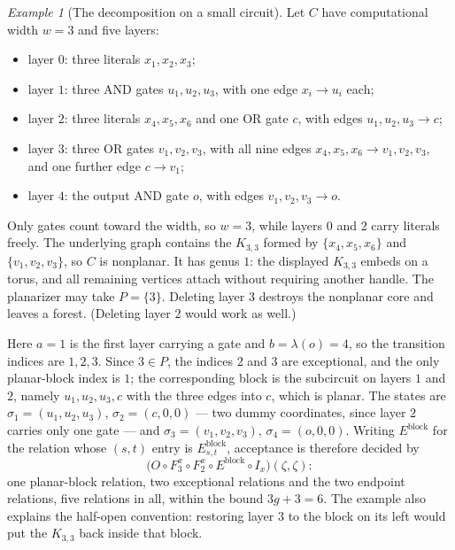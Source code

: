 \documentclass[11pt]{article}
\theoremstyle{definition}
\theoremstyle{remark}
\newtheorem{example}[theorem]{Example}
\newcommand{\layer}{\lambda}
\newcommand{\comp}{\circ}
\begin{document}
\begin{example}[The decomposition on a small circuit]\label{ex:pipeline}
Let $C$ have computational width $w=3$ and five layers:
\begin{itemize}
\item layer $0$: three literals $x_1,x_2,x_3$;
\item layer $1$: three $\mathrm{AND}$ gates $u_1,u_2,u_3$, with one edge $x_i\to u_i$ each;
\item layer $2$: three literals $x_4,x_5,x_6$ and one $\mathrm{OR}$ gate $c$, with edges
      $u_1,u_2,u_3\to c$;
\item layer $3$: three $\mathrm{OR}$ gates $v_1,v_2,v_3$, with all nine edges
      $x_4,x_5,x_6\to v_1,v_2,v_3$, and one further edge $c\to v_1$;
\item layer $4$: the output $\mathrm{AND}$ gate $o$, with edges $v_1,v_2,v_3\to o$.
\end{itemize}
Only gates count toward the width, so $w=3$, while layers $0$ and $2$ carry literals
freely. The underlying graph contains the $K_{3,3}$ formed by $\{x_4,x_5,x_6\}$ and
$\{v_1,v_2,v_3\}$, so $C$ is nonplanar.  It has genus $1$: the displayed $K_{3,3}$
embeds on a torus, and all remaining vertices attach without requiring another
handle.  The planarizer may take $P=\{3\}$.  Deleting layer $3$ destroys the
nonplanar core and leaves a forest.  (Deleting layer $2$ would work as well.)

Here $a=1$ is the first layer carrying a gate and $b=\layer(o)=4$, so the transition
indices are $1,2,3$. Since $3\in P$, the indices $2$ and $3$ are exceptional, and the
only planar-block index is $1$; the corresponding block is the subcircuit on layers $1$
and $2$, namely $u_1,u_2,u_3,c$ with the three edges into $c$, which is planar. The
states are $\sigma_1=(u_1,u_2,u_3)$, $\sigma_2=(c,0,0)$ --- two dummy coordinates, since
layer $2$ carries only one gate --- and $\sigma_3=(v_1,v_2,v_3)$,
$\sigma_4=(o,0,0)$. Writing $E^{\mathrm{block}}$ for the relation whose $(s,t)$ entry is
$E^{\mathrm{block}}_{s,t}$, acceptance is therefore decided by
\[
\bigl(O\comp F^x_{3}\comp F^x_{2}\comp E^{\mathrm{block}}\comp I_x\bigr)(\zeta,\zeta):
\]
one planar-block relation, two exceptional relations and the two endpoint relations,
five relations in all, within the bound $3g+3=6$.  The example also explains the
half-open convention: restoring layer $3$ to the block on its left would put the
$K_{3,3}$ back inside that block.
\end{example}
\end{document}
